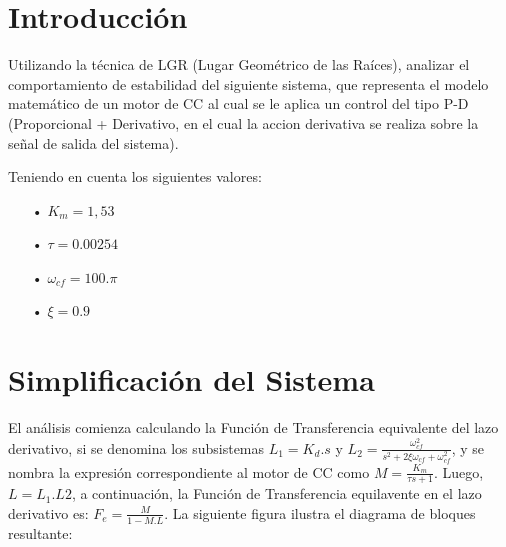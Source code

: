 \documentclass[12pt,letterpaper]{article}
\author{}
\date{}
\begin{document}




\section{Introducción}
Utilizando la técnica de LGR (Lugar Geométrico de las Raíces), analizar el comportamiento de estabilidad del siguiente sistema, que representa el modelo matemático de un motor de CC al cual se le aplica un control del tipo P-D (Proporcional + Derivativo, en el cual la accion derivativa se realiza sobre la señal de salida del sistema).
\begin{figure}[H]
\centering
{}
\end{figure}
Teniendo en cuenta los siguientes valores:
\begin{enumerate}
\item[•]$K_{m}=1,53$
\item[•]$\tau=0.00254$
\item[•]$\omega_{cf}=100 . \pi$
\item[•]$\xi=0.9$
\end{enumerate}
\section{Simplificación del Sistema}
El análisis comienza calculando la Función de Transferencia equivalente del lazo derivativo, si se denomina los subsistemas $L_{1}= K_{d}.s$ y $L_{2}=\frac{\omega_{cf}^{2}}{s^{2}+2 \xi \omega_{cf}+\omega_{cf}^{2}}$, y se nombra la expresión correspondiente al motor de CC como $M = \frac{K_{m}}{\tau s+1}$. Luego, $L=L_{1}.L{2}$, a continuación, la Función de Transferencia equilavente en el lazo derivativo es: $F_{e} = \frac{M}{1-M.L} $.
La siguiente figura ilustra el diagrama de bloques resultante:
\begin{figure}[H]
\centering
{}
\end{figure}
\end{document}
